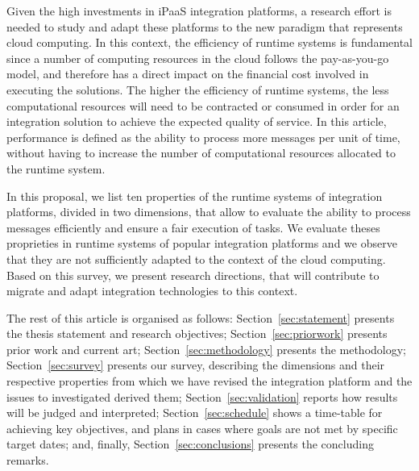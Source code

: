 Given the high investments in iPaaS integration platforms, a research effort is needed to study and adapt these platforms to the new paradigm that represents cloud computing. In this context, the efficiency of runtime systems is fundamental since a number of computing resources in the cloud follows the pay-as-you-go model, and therefore has a direct impact on the financial cost involved in executing the solutions. The higher the efficiency of runtime systems, the less computational resources will need to be contracted or consumed in order for an integration solution to achieve the expected quality of service. In this article, performance is defined as the ability to process more messages per unit of time, without having to increase the number of computational resources allocated to the runtime system.

In this proposal, we list ten properties of the runtime systems of integration platforms, divided in two dimensions,  that allow to evaluate the ability to process messages efficiently and ensure a fair execution of tasks. We evaluate theses proprieties in runtime systems of popular integration platforms and we observe that they are not sufficiently adapted to the context of the cloud computing. Based on this survey, we present research directions, that will contribute to migrate and adapt integration technologies to this context.

The rest of this article is organised as follows: Section~\ref{sec:statement} presents the thesis statement and research objectives; Section~\ref{sec:priorwork} presents prior work and current art; Section~\ref{sec:methodology} presents the methodology; Section~\ref{sec:survey} presents our survey, describing the dimensions and their respective properties from which we have revised the integration platform and the issues to investigated derived them; Section~\ref{sec:validation} reports how results will be judged and interpreted; Section~\ref{sec:schedule} shows a time-table for achieving key objectives, and plans in cases where goals are not met by specific target dates; and, finally, Section~\ref{sec:conclusions} presents the concluding remarks.

